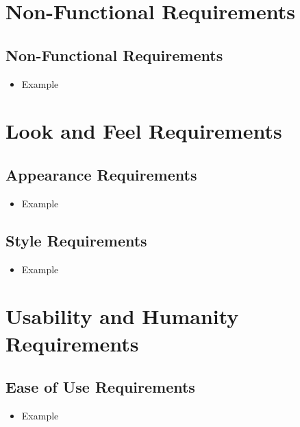 \documentclass[12pt]{article}
\begin{document}
\section{Non-Functional Requirements}
  \subsection{Non-Functional Requirements}
    \begin{itemize}
        \item Example
      \end{itemize}

\section{Look and Feel Requirements}
  \subsection{Appearance Requirements}
    \begin{itemize}
      \item Example
    \end{itemize}

  \subsection{Style Requirements}
    \begin{itemize}
      \item Example
    \end{itemize}

\section{Usability and Humanity Requirements}
  \subsection{Ease of Use Requirements}
    \begin{itemize}
      \item Example
    \end{itemize}
\end{document}
